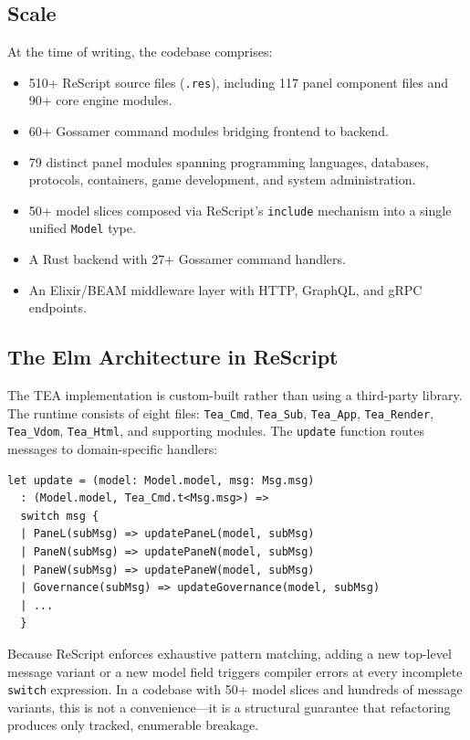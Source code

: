 \documentclass[11pt,a4paper]{article}
\newcommand{\tea}{\textsc{TEA}}
\begin{document}
\subsection{Scale}

At the time of writing, the codebase comprises:
\begin{itemize}
  \item 510+ ReScript source files (\texttt{.res}), including
    117 panel component files and 90+ core engine modules.
  \item 60+ Gossamer command modules bridging frontend to backend.
  \item 79 distinct panel modules spanning programming languages,
    databases, protocols, containers, game development, and
    system administration.
  \item 50+ model slices composed via ReScript's \texttt{include}
    mechanism into a single unified \texttt{Model} type.
  \item A Rust backend with 27+ Gossamer command handlers.
  \item An Elixir/BEAM middleware layer with HTTP, GraphQL, and
    gRPC endpoints.
\end{itemize}

\subsection{The Elm Architecture in ReScript}

The \tea{} implementation is custom-built rather than using a
third-party library. The runtime consists of eight files:
\texttt{Tea\_Cmd}, \texttt{Tea\_Sub}, \texttt{Tea\_App},
\texttt{Tea\_Render}, \texttt{Tea\_Vdom}, \texttt{Tea\_Html},
and supporting modules. The \texttt{update} function routes
messages to domain-specific handlers:

\begin{verbatim}
let update = (model: Model.model, msg: Msg.msg)
  : (Model.model, Tea_Cmd.t<Msg.msg>) =>
  switch msg {
  | PaneL(subMsg) => updatePaneL(model, subMsg)
  | PaneN(subMsg) => updatePaneN(model, subMsg)
  | PaneW(subMsg) => updatePaneW(model, subMsg)
  | Governance(subMsg) => updateGovernance(model, subMsg)
  | ...
  }
\end{verbatim}

Because ReScript enforces exhaustive pattern matching, adding a new
top-level message variant or a new model field triggers compiler
errors at every incomplete \texttt{switch} expression. In a codebase
with 50+ model slices and hundreds of message variants, this is not
a convenience---it is a structural guarantee that refactoring
produces only tracked, enumerable breakage.
\end{document}
